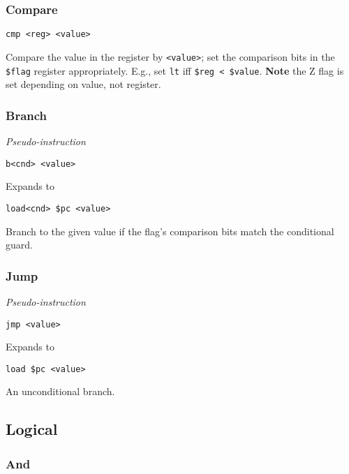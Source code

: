 \subsubsection{Compare}

\begin{lstlisting}[style=assembly]
    cmp <reg> <value>
\end{lstlisting}

Compare the value in the register by \texttt{<value>}; set the comparison bits in the \texttt{\$flag} register appropriately.
E.g., set \texttt{lt} iff \texttt{\$reg < \$value}.
\textbf{Note} the Z flag is set depending on value, not register.

\subsubsection{Branch}

\textit{Pseudo-instruction}

\begin{lstlisting}[style=assembly]
    b<cnd> <value>
\end{lstlisting}

Expands to

\begin{lstlisting}[style=assembly]
    load<cnd> $pc <value>
\end{lstlisting}

Branch to the given value if the flag's comparison bits match the conditional guard.

\subsubsection{Jump}

\textit{Pseudo-instruction}

\begin{lstlisting}[style=assembly]
    jmp <value>
\end{lstlisting}

Expands to

\begin{lstlisting}[style=assembly]
    load $pc <value>
\end{lstlisting}

An unconditional branch.

\subsection{Logical}

\subsubsection{And}

